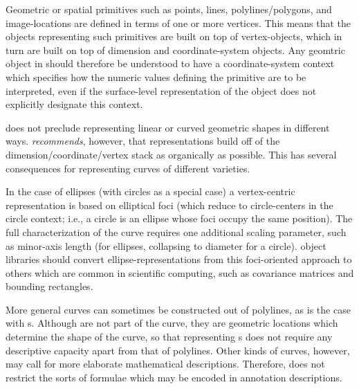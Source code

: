 {\begin{description}
Geometric or spatial primitives such as points, lines, 
polylines/polygons, and image-locations are  
defined in terms of one or more vertices.  
This means that the objects representing such 
primitives are built on top of vertex-objects, 
which in turn are built on top of dimension 
and coordinate-system objects.  Any geomtric 
object in \AXFI{} should therefore be understood 
to have a coordinate-system context which specifies 
how the numeric values defining the primitive 
are to be interpreted, even if the surface-level 
representation of the object does not explicitly 
designate this context. 

\item[Circles, Ellipses, and Curves]  
\label{ph:curves}
\lAXFI{} does not preclude representing linear or curved 
geometric shapes in different ways.  \lAXFI{} 
\textit{recommends}, however, that 
representations build off of the dimension/coordinate/vertex 
stack as organically as possible.  This has several 
consequences for representing curves of different 
varieties.  

In the case of ellipses (with circles as a special case) 
a vertex-centric representation is based on elliptical 
foci (which reduce to circle-centers in the circle 
context; i.e., a circle is an ellipse whose foci occupy 
the same position).  The full characterization of 
the curve requires one additional scaling parameter, 
such as minor-axis length (for ellipses, collapsing 
to diameter for a circle).  \lAXFI{} object libraries  
should convert ellipse-representations from 
this foci-oriented approach to others which are 
common in scientific computing, such as covariance matrices 
and bounding rectangles.  

More general curves can sometimes be constructed out 
of polylines, as is the case with 
\BSPLINE{}s.  Although \BSPLINE{}  
are not part of the curve, they are geometric 
locations which determine the shape of the curve, 
so that representing \BSPLINE{}s does not require 
any descriptive capacity apart from that of 
polylines.  Other kinds of curves, however, 
may call for more elaborate mathematical 
descriptions.  Therefore, \AXFI{} does not 
restrict the sorts of formulae which may be 
encoded in annotation descriptions.


\end{description}}
